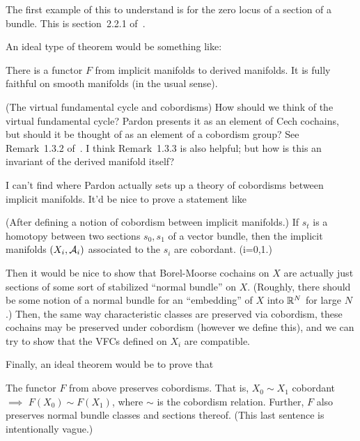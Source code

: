 					The first example of this to understand is for the zero locus of a section of a bundle. This is section~2.2.1 of~\cite{pardon}.
				\item
					An ideal type of theorem would be something like:
						\begin{theorem}
						There is a functor $F$ from implicit manifolds to derived manifolds. It is fully faithful on smooth manifolds (in the usual sense).
						\end{theorem}
			\enumd
	\item (The virtual fundamental cycle and cobordisms)
		How should we think of the virtual fundamental cycle? Pardon presents it as an element of Cech cochains, but should it be thought of as an element of a cobordism group? See Remark~1.3.2 of~\cite{pardon}. I think Remark~1.3.3 is also helpful; but how is this an invariant of the derived manifold itself?
			\enum
				\item
					I can't find where Pardon actually sets up a theory of cobordisms between implicit manifolds. It'd be nice to prove a statement like
					\begin{theorem}
					(After defining a notion of cobordism between implicit manifolds.) If $s_t$ is a homotopy between two sections $s_0, s_1$ of a vector bundle, then the implicit manifolds $(X_i, \mathcal A_i)$ associated to the $s_i$ are cobordant. (i=0,1.)
					\end{theorem}
				\item
					Then it would be nice to show that Borel-Moorse cochains on $X$ are actually just sections of some sort of stabilized ``normal bundle'' on $X$. (Roughly, there should be some notion of a normal bundle for an ``embedding'' of $X$ into $\mathbb R^N$ for large $N$.) Then, the same way characteristic classes are preserved via cobordism, these cochains may be preserved under cobordism (however we define this), and we can try to show that the VFCs defined on $X_i$ are compatible.
				\item
					Finally, an ideal theorem would be to prove that 
					\begin{theorem}
						The functor $F$ from above preserves cobordisms. That is, $X_0 \sim X_1$ cobordant $\implies$ $F(X_0) \sim F(X_1)$, where $\sim$ is the cobordism relation. Further, $F$ also preserves normal bundle classes and sections thereof. (This last sentence is intentionally vague.)
					\end{theorem}
